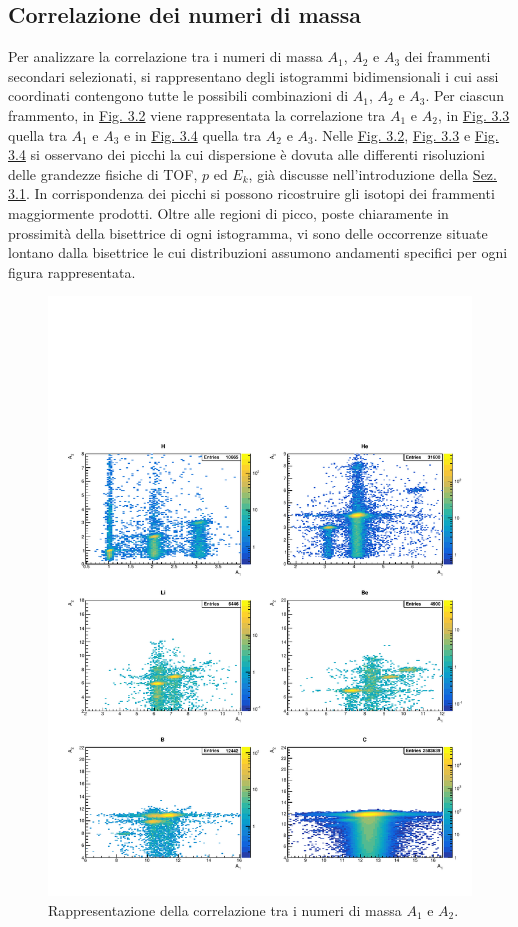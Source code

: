 \documentclass[12pt,a4paper,twoside]{report}
\begin{document}
	\subsection{Correlazione dei numeri di massa}\label{sec:correlation_number_mass}
	Per analizzare la correlazione tra i numeri di massa $A_1$, $A_2$ e $A_3$ dei frammenti secondari selezionati, si rappresentano degli istogrammi bidimensionali i cui assi coordinati contengono tutte le possibili combinazioni di $A_1$, $A_2$ e $A_3$. Per ciascun frammento, in \hyperref[fig:a1]{Fig. 3.2} viene rappresentata la correlazione tra $A_1$ e $A_2$, in \hyperref[fig:a2]{Fig. 3.3} quella tra $A_1$ e $A_3$ e in \hyperref[fig:a3]{Fig. 3.4} quella tra $A_2$ e $A_3$. Nelle \hyperref[fig:a1]{Fig. 3.2}, \hyperref[fig:a2]{Fig. 3.3} e \hyperref[fig:a3]{Fig. 3.4} si osservano dei picchi la cui dispersione è dovuta alle differenti risoluzioni delle grandezze fisiche di TOF, $p$ ed $E_k$, già discusse nell'introduzione della \hyperref[sec:fragment_identification]{Sez. 3.1}. In corrispondenza dei picchi si possono ricostruire gli isotopi dei frammenti maggiormente prodotti. Oltre alle regioni di picco, poste chiaramente in prossimità della bisettrice di ogni istogramma, vi sono delle occorrenze situate lontano dalla bisettrice le cui distribuzioni assumono andamenti specifici per ogni figura rappresentata.
	\begin{figure}[H]
		\centering
		\includegraphics[width=1.03\linewidth,center]{c_MultiCanvasLog1.pdf}
		\caption{Rappresentazione della correlazione tra i numeri di massa $A_1$ e $A_2$.}
		\label{fig:a1}
	\end{figure}
\end{document}
